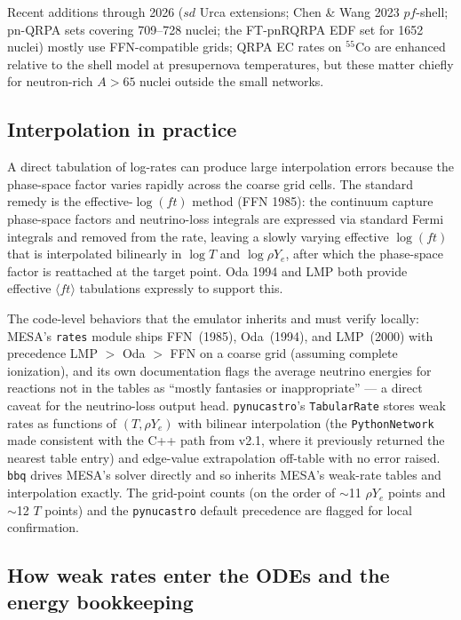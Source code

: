 \documentclass[11pt]{article}
\newcommand{\nuc}[2]{\ensuremath{{}^{#2}\mathrm{#1}}}
\begin{document}
Recent additions through 2026 ($sd$ Urca extensions; Chen \& Wang 2023 $pf$-shell; pn-QRPA sets covering 709--728 nuclei; the FT-pnRQRPA EDF set for 1652 nuclei) mostly use FFN-compatible grids; QRPA EC rates on $\nuc{Co}{55}$ are enhanced relative to the shell model at presupernova temperatures, but these matter chiefly for neutron-rich $A > 65$ nuclei outside the small networks.

\subsection{Interpolation in practice}

A direct tabulation of log-rates can produce large interpolation errors because the phase-space factor varies rapidly across the coarse grid cells. The standard remedy is the effective-$\log(ft)$ method (FFN 1985): the continuum capture phase-space factors and neutrino-loss integrals are expressed via standard Fermi integrals and removed from the rate, leaving a slowly varying effective $\log(ft)$ that is interpolated bilinearly in $\log T$ and $\log \rho Y_e$, after which the phase-space factor is reattached at the target point. Oda 1994 and LMP both provide effective $\langle ft\rangle$ tabulations expressly to support this.

The code-level behaviors that the emulator inherits and must verify locally: MESA's \texttt{rates} module ships FFN~(1985), Oda~(1994), and LMP~(2000) with precedence LMP $>$ Oda $>$ FFN on a coarse grid (assuming complete ionization), and its own documentation flags the average neutrino energies for reactions not in the tables as ``mostly fantasies or inappropriate'' --- a direct caveat for the neutrino-loss output head. \texttt{pynucastro}'s \texttt{TabularRate} stores weak rates as functions of $(T, \rho Y_e)$ with bilinear interpolation (the \texttt{PythonNetwork} made consistent with the C++ path from v2.1, where it previously returned the nearest table entry) and edge-value extrapolation off-table with no error raised. \texttt{bbq} drives MESA's solver directly and so inherits MESA's weak-rate tables and interpolation exactly. The grid-point counts (on the order of $\sim$11 $\rho Y_e$ points and $\sim$12 $T$ points) and the \texttt{pynucastro} default precedence are flagged for local confirmation.

\subsection{How weak rates enter the ODEs and the energy bookkeeping}
\end{document}
